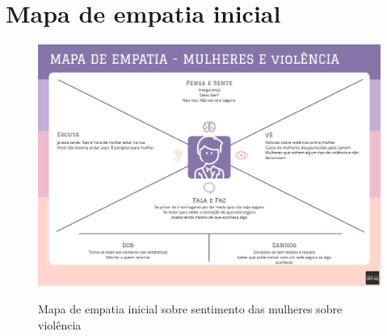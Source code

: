 

\section{Mapa de empatia inicial}
\begin{figure}[htbp]
  \begin{center}
  \includegraphics[width=.9\linewidth]{images/mapa-empatia-inicial.png}\\
  \end{center}
  \caption[Mapa de empatia inicial]{Mapa de empatia inicial sobre sentimento das mulheres sobre violência}
  \label{fig:mapa-empatia-inicial}
\end{figure}
\pagebreak

